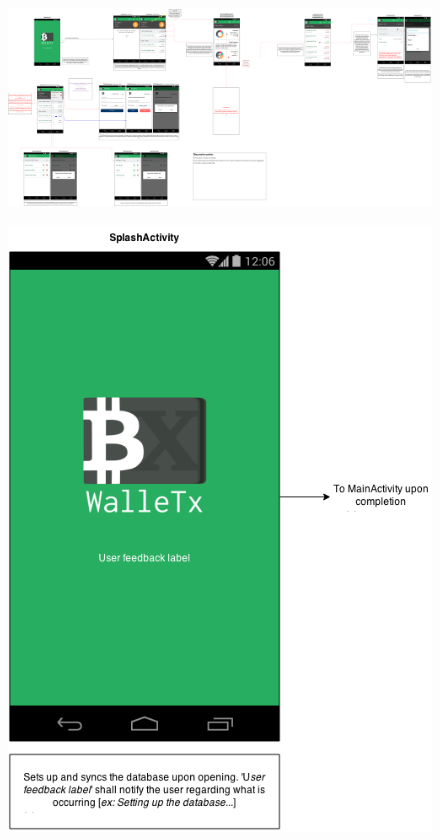   \begin{figure}[H]
     \includegraphics[width=1.0\textwidth]{../diagrams/storyboard_master.png}
  \end{figure}
  \begin{figure}[H]
     \includegraphics[width=1.0\textwidth]{../diagrams/storyboard_splash.png}
  \end{figure}
